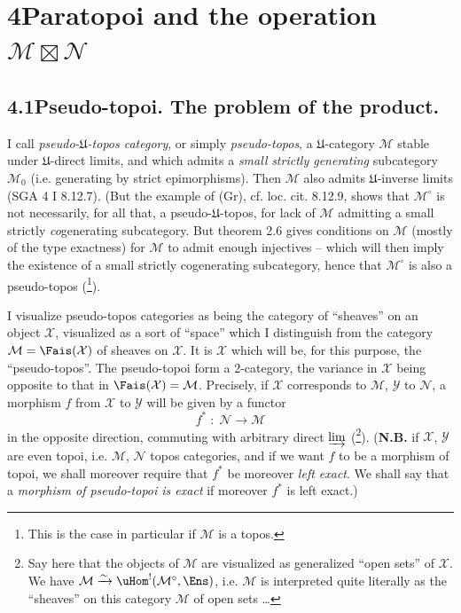 

\section*{4\quad Paratopoi and the operation $\mathcal{M}\boxtimes\mathcal{N}$}

\subsection*{4.1\quad Pseudo-topoi. The problem of the product.}

I call \textit{pseudo-$\mathfrak{U}$-topos category}, or simply \textit{pseudo-topos}, a $\mathfrak{U}$-category $\mathcal{M}$ stable under $\mathfrak{U}$-direct limits, and which admits a \textit{small} \textit{strictly generating} subcategory $\mathcal{M}_0$ (i.e. generating by strict epimorphisms). Then $\mathcal{M}$ also admits $\mathfrak{U}$-inverse limits (SGA 4 I 8.12.7). (But the example of (Gr), cf. loc. cit. 8.12.9, shows that $\mathcal{M}^\circ$ is not necessarily, for all that, a pseudo-$\mathfrak{U}$-topos, for lack of $\mathcal{M}$ admitting a small strictly \textit{co}generating subcategory. But theorem 2.6 gives conditions on $\mathcal{M}$ (mostly of the type exactness) %
for $\mathcal{M}$ to admit enough injectives -- which will then imply the existence of a small strictly cogenerating subcategory, hence that $\mathcal{M}^\circ$ is also a pseudo-topos (\footnote{This is the case in particular if $\mathcal{M}$ is a topos.}).

I visualize pseudo-topos categories as being the category of ``sheaves'' on an object $\mathcal{X}$, visualized as a sort of ``space'' which I distinguish from the category $\mathcal{M}=\Fais(\mathcal{X})$ of sheaves on $\mathcal{X}$. It is $\mathcal{X}$ which will be, for this purpose, the ``pseudo-topos''. The pseudo-topoi form a 2-category, the variance in $\mathcal{X}$ being opposite to that in $\Fais(\mathcal{X})=\mathcal{M}$. Precisely, if $\mathcal{X}$ corresponds to $\mathcal{M}$, $\mathcal{Y}$ to $\mathcal{N}$, a morphism $f$ from $\mathcal{X}$ to $\mathcal{Y}$ will be given by a functor
\[
f^* \;:\; \mathcal{N} \longrightarrow \mathcal{M}
\tag*{(4.1.1)}
\]
in the opposite direction, commuting with arbitrary direct $\varinjlim$ (\footnote{Say here that the objects of $\mathcal{M}$ are visualized as generalized ``open sets'' of $\mathcal{X}$. We have $\mathcal{M}\xrightarrow{\sim}\uHom^!(\mathcal{M}^\circ,\Ens)$, i.e. $\mathcal{M}$ is interpreted quite literally as the ``sheaves'' on this category $\mathcal{M}$ of open sets \ldots}). (\textbf{N.B.} if $\mathcal{X}$, $\mathcal{Y}$ are even topoi, i.e. $\mathcal{M}$, $\mathcal{N}$ topos categories, and if we want $f$ to be a morphism of topoi, we shall moreover require that $f^*$ be moreover \textit{left exact}. We shall say that a \textit{morphism of pseudo-topoi is exact} if moreover $f^*$ is left exact.)

